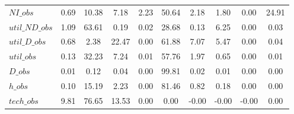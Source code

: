 \begin{center}
\begin{longtable}{lccccccccc}
$NI\_obs        $	 & 	         0.69	 & 	        10.38	 & 	         7.18	 & 	         2.23	 & 	        50.64	 & 	         2.18	 & 	         1.80	 & 	         0.00	 & 	        24.91 \\ 
$util\_ND\_obs  $	 & 	         1.09	 & 	        63.61	 & 	         0.19	 & 	         0.02	 & 	        28.68	 & 	         0.13	 & 	         6.25	 & 	         0.00	 & 	         0.03 \\ 
$util\_D\_obs   $	 & 	         0.68	 & 	         2.38	 & 	        22.47	 & 	         0.00	 & 	        61.88	 & 	         7.07	 & 	         5.47	 & 	         0.00	 & 	         0.04 \\ 
$util\_obs      $	 & 	         0.13	 & 	        32.23	 & 	         7.24	 & 	         0.01	 & 	        57.76	 & 	         1.97	 & 	         0.65	 & 	         0.00	 & 	         0.01 \\ 
$D\_obs         $	 & 	         0.01	 & 	         0.12	 & 	         0.04	 & 	         0.00	 & 	        99.81	 & 	         0.02	 & 	         0.01	 & 	         0.00	 & 	         0.00 \\ 
$h\_obs         $	 & 	         0.10	 & 	        15.19	 & 	         2.23	 & 	         0.00	 & 	        81.46	 & 	         0.82	 & 	         0.18	 & 	         0.00	 & 	         0.00 \\ 
$tech\_obs      $	 & 	         9.81	 & 	        76.65	 & 	        13.53	 & 	         0.00	 & 	         0.00	 & 	        -0.00	 & 	        -0.00	 & 	        -0.00	 & 	         0.00 \\ 
\end{longtable}
 \end{center}
